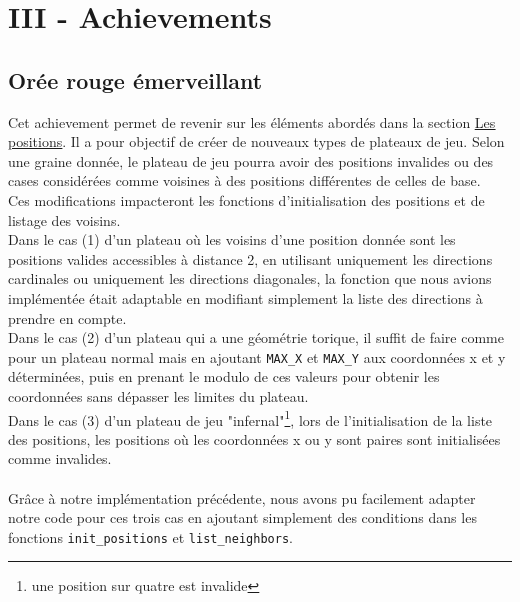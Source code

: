 \vspace*{-0.9cm}
\section*{III - Achievements}
\subsection*{Orée rouge émerveillant}
\label{sec:ore}
Cet achievement permet de revenir sur les éléments abordés dans la section \hyperref[sec:pos]{\uline{Les positions}}. Il a pour objectif de créer de nouveaux types de plateaux de jeu. Selon une graine donnée, le plateau de jeu pourra avoir des positions invalides ou des cases considérées comme voisines à des positions différentes de celles de base.\\

Ces modifications impacteront les fonctions d'initialisation des positions et de listage des voisins.\\

Dans le cas (1) d'un plateau où les voisins d'une position donnée sont les positions valides accessibles à distance 2, en utilisant uniquement les directions cardinales ou uniquement les directions diagonales, la fonction que nous avions implémentée était adaptable en modifiant simplement la liste des directions à prendre en compte.\\

Dans le cas (2) d'un plateau qui a une géométrie torique, il suffit de faire comme pour un plateau normal mais en ajoutant \texttt{MAX\_X} et \texttt{MAX\_Y} aux coordonnées x et y déterminées, puis en prenant le modulo de ces valeurs pour obtenir les coordonnées sans dépasser les limites du plateau.\\

Dans le cas (3) d'un plateau de jeu "infernal"\footnote{une position sur quatre est invalide}, lors de l'initialisation de la liste des positions, les positions où les coordonnées x ou y sont paires sont initialisées comme invalides. \\ \\
Grâce à notre implémentation précédente, nous avons pu facilement adapter notre code pour ces trois cas en ajoutant simplement des conditions dans les fonctions \texttt{init\_positions} et \texttt{list\_neighbors}.
